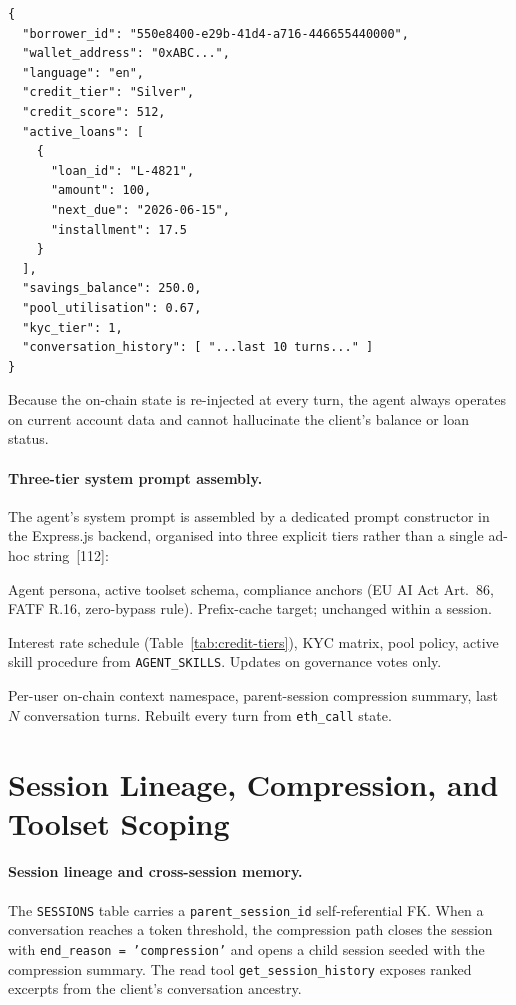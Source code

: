 \documentclass[12pt,a4paper]{report}
\begin{document}
\begin{verbatim}
{
  "borrower_id": "550e8400-e29b-41d4-a716-446655440000",
  "wallet_address": "0xABC...",
  "language": "en",
  "credit_tier": "Silver",
  "credit_score": 512,
  "active_loans": [
    {
      "loan_id": "L-4821",
      "amount": 100,
      "next_due": "2026-06-15",
      "installment": 17.5
    }
  ],
  "savings_balance": 250.0,
  "pool_utilisation": 0.67,
  "kyc_tier": 1,
  "conversation_history": [ "...last 10 turns..." ]
}
\end{verbatim}

\noindent Because the on-chain state is re-injected at every turn, the agent always operates on current account data and cannot hallucinate the client's balance or loan status.

\paragraph{Three-tier system prompt assembly.}
The agent's system prompt is assembled by a dedicated prompt constructor in the Express.js backend, organised into three explicit tiers rather than a single ad-hoc string~[112]:

\begin{description}[noitemsep,leftmargin=0pt]
\item[\textbf{Stable tier.}] Agent persona, active toolset schema, compliance anchors (EU AI Act Art.~86, FATF R.16, zero-bypass rule). Prefix-cache target; unchanged within a session.
\item[\textbf{Context tier.}] Interest rate schedule (Table~\ref{tab:credit-tiers}), KYC matrix, pool policy, active skill procedure from \texttt{AGENT\_SKILLS}. Updates on governance votes only.
\item[\textbf{Volatile tier.}] Per-user on-chain context namespace, parent-session compression summary, last $N$ conversation turns. Rebuilt every turn from \texttt{eth\_call} state.
\end{description}

\section{Session Lineage, Compression, and Toolset Scoping}

\paragraph{Session lineage and cross-session memory.}
The \texttt{SESSIONS} table carries a \texttt{parent\_session\_id} self-referential FK. When a conversation reaches a token threshold, the compression path closes the session with \texttt{end\_reason = 'compression'} and opens a child session seeded with the compression summary. The read tool \texttt{get\_session\_history} exposes ranked excerpts from the client's conversation ancestry.
\end{document}
